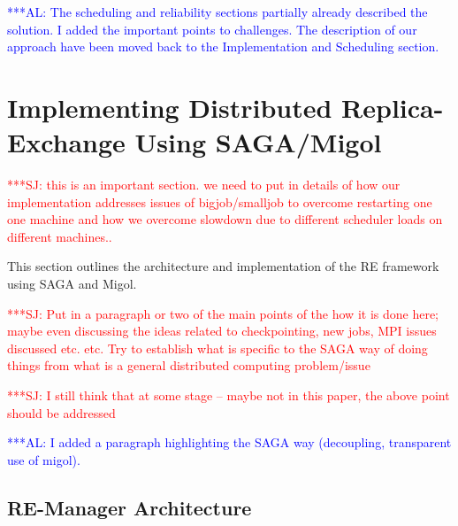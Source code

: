 \documentclass{rspublic}
\newcommand{\alnote}[1]{ {\textcolor{blue} { ***AL: #1 }}}
\newcommand{\jhanote}[1]{ {\textcolor{red} { ***SJ: #1 }}}
\newcommand{\alnote}[1]{}
\newcommand{\jhanote}[1]{}
\begin{document}

\alnote{The scheduling and reliability sections partially already described the solution. 
I added the important points to challenges. The description of our approach have been 
moved back to the Implementation and Scheduling section.}
                         
\section{Implementing Distributed Replica-Exchange Using SAGA/Migol}
\label{sec:remd_impl}
\jhanote{this is an important section. we need to put in details of
  how our implementation addresses issues of bigjob/smalljob to
  overcome restarting one one machine and how we overcome slowdown due
  to different scheduler loads on different machines..}


This section outlines the architecture and implementation of the RE
framework using SAGA and Migol.

\jhanote{Put in a paragraph or two of the main points of the
  how it is done here; maybe even discussing the ideas related to
  checkpointing, new jobs, MPI issues discussed etc. etc. Try to
  establish what is specific to the SAGA way of doing things from what
  is a general distributed computing problem/issue}

\jhanote{I still think that at some stage -- maybe not in this paper,
  the above point should be addressed}      
  
\alnote{I added a paragraph highlighting the SAGA way (decoupling, transparent use of migol).}  
          
\subsection{RE-Manager Architecture}
\end{document}

